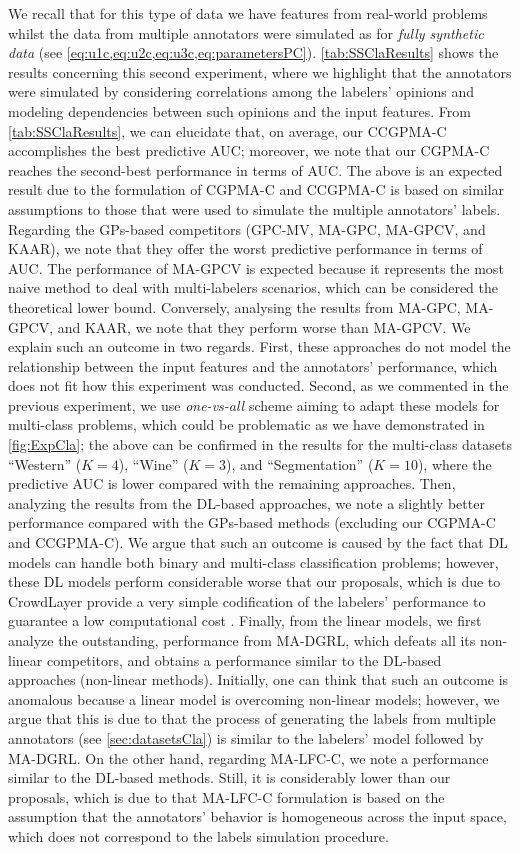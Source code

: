 \documentclass[journal]{IEEEtran}
\begin{document}
We recall that for this type of data we have features from real-world problems whilst the data from multiple annotators were simulated as for \textit{fully synthetic data} (see \cref{eq:u1c,eq:u2c,eq:u3c,eq:parametersPC}). \cref{tab:SSClaResults} shows the results concerning this second experiment, where we highlight that the annotators were simulated by considering correlations among the labelers' opinions and modeling dependencies between such opinions and the input features. From \cref{tab:SSClaResults}, we can elucidate that, on average, our CCGPMA-C accomplishes the best predictive AUC; moreover, we note that our CGPMA-C reaches the second-best performance in terms of AUC. The above is an expected result due to the formulation of CGPMA-C and CCGPMA-C is based on similar assumptions to those that were used to simulate the multiple annotators' labels. Regarding the GPs-based competitors (GPC-MV, MA-GPC, MA-GPCV, and KAAR), we note that they offer the worst predictive performance in terms of AUC. The performance of MA-GPCV is expected because it represents the most naive method to deal with multi-labelers scenarios, which can be considered the theoretical lower bound. Conversely, analysing the results from MA-GPC, MA-GPCV, and KAAR, we note that they perform worse than MA-GPCV. We explain such an outcome in two regards. First, these approaches do not model the relationship between the input features and the annotators' performance, which does not fit how this experiment was conducted. Second, as we commented in the previous experiment, we use \textit{one-vs-all} scheme aiming to adapt these models for multi-class problems, which could be problematic as we have demonstrated in \cref{fig:ExpCla}; the above can be confirmed in the results for the multi-class datasets ``Western'' ($K=4$), ``Wine'' ($K=3$), and ``Segmentation'' ($K=10$), where the predictive AUC is lower compared with the remaining approaches. Then, analyzing the results from the DL-based approaches, we note a slightly better performance compared with the GPs-based methods (excluding our CGPMA-C and CCGPMA-C). We argue that such an outcome is caused by the fact that DL models can handle both binary and multi-class classification problems; however, these DL models perform considerable worse that our proposals, which is due to CrowdLayer provide a very simple codification of the labelers' performance to guarantee a low computational cost \cite{morales2019scalable1}. Finally, from the linear models, we first analyze the outstanding, performance from MA-DGRL, which defeats all its non-linear competitors, and obtains a  performance similar to the DL-based approaches (non-linear methods). Initially, one can think that such an outcome is anomalous because a linear model is overcoming non-linear models; however, we argue that this is due to that the process of generating the labels from multiple annotators (see \cref{sec:datasetsCla}) is similar to the labelers' model followed by MA-DGRL. On the other hand, regarding MA-LFC-C, we note a performance similar to the DL-based methods. Still, it is considerably lower than our proposals, which is due to that MA-LFC-C formulation is based on the assumption that the annotators' behavior is homogeneous across the input space, which does not correspond to the labels simulation procedure.   
\end{document}

